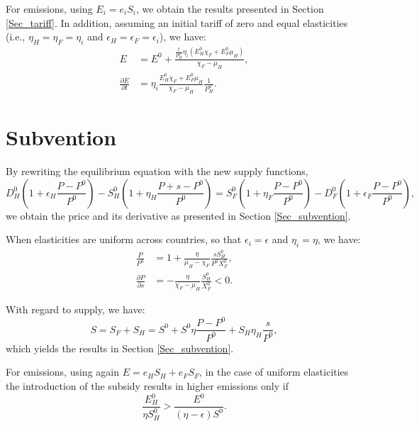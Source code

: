 For emissions, using $E_i = e_i S_i$, we obtain the results presented in Section \ref{Sec_tariff}. In addition, assuming an initial tariff of zero and equal elasticities (i.e., $\eta_H = \eta_F = \eta_i$ and $\epsilon_H = \epsilon_F = \epsilon_i$), we have:
\begin{align*}
E &= E^0 + \frac{\frac{t}{P_H^0} \eta_i (E_H^0 \chi_F + E_F^0 \mu_H)}{\chi_F - \mu_H}, \\[1mm]
\frac{\partial E}{\partial t} &= \eta_i \frac{E_H^0 \chi_F + E_F^0 \mu_H}{\chi_F - \mu_H}\frac{1}{P_H^0}.
\end{align*}

\section{Subvention}\label{appendix:intuitions_subvention}

By rewriting the equilibrium equation with the new supply functions,
$$
D_H^0\left(1+\epsilon_H \frac{P - P^0}{P^0}\right) - S_H^0\left(1+\eta_H \frac{P + s - P^0}{P^0}\right) = S_F^0 \left(1+\eta_F \frac{P - P^0}{P^0}\right) - D_F^0\left(1+\epsilon_F \frac{P - P^0}{P^0}\right),
$$
we obtain the price and its derivative as presented in Section \ref{Sec_subvention}.

When elasticities are uniform across countries, so that $\epsilon_i = \epsilon$ and $\eta_i = \eta$, we have:
\begin{align*}
\frac{P}{P^0} &= 1 + \frac{\eta}{\mu_H - \chi_F} \frac{s S_H^0}{P^0 X_F^0}, \\
\frac{\partial P}{\partial s} &= -\frac{\eta}{\chi_F - \mu_H} \frac{S_H^0}{X_F^0} < 0.
\end{align*}

With regard to supply, we have:
$$
S = S_F + S_H =  S^0 + S^0 \eta \frac{P- P^0}{P^0} + S_H \eta_H \frac{s}{P^0},
$$
which yields the results in Section \ref{Sec_subvention}.

For emissions, using again $E = e_H S_H + e_F S_F$, in the case of uniform elasticities the introduction of the subsidy results in higher emissions only if
$$
\frac{E_H^0}{\eta S_H^0} > \frac{E^0}{(\eta - \epsilon)S^0}.
$$
